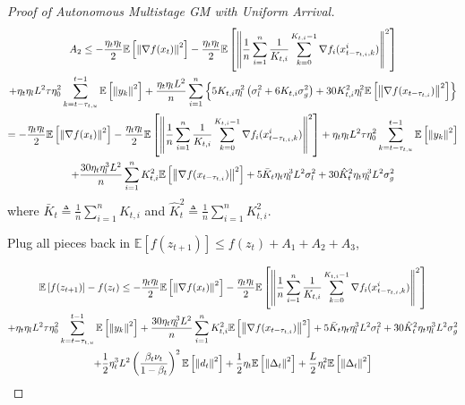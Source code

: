 \begin{proof}[Proof of Autonomous Multistage GM with Uniform Arrival]
\begin{equation}
\begin{gathered}
A_2 \leq - \frac{\eta_t\eta_l}{2} \mathbb{E}\left[\left\| \nabla f(x_t) \right\|^2\right] - \frac{\eta_t\eta_l}{2} \mathbb{E}\left[\left\| \frac{1}{n}\sum_{i=1}^n \frac{1}{K_{t,i}} \sum_{k=0}^{K_{t,i}-1} \nabla f_i(x_{t-\tau_{t,i},k}^i) \right\|^2\right] \\
+  \eta_t\eta_l L^2 \tau \eta_0^2 \sum_{k=t-\tau_{t,u}}^{t-1}\mathbb{E}\left[\left\|  y_k \right\|^2\right]  + \frac{\eta_t\eta_l L^2}{n}\sum_{i=1}^n \left\{ 5 K_{t,i}\eta_l^2\left(\sigma_l^2+6K_{t,i}\sigma_g^2\right)+30K_{t,i}^2\eta_l^2 \mathbb{E}\left[\left\| \nabla f(x_{t-\tau_{t,i}})\right\|^2\right]\right\}\\
=- \frac{\eta_t\eta_l}{2} \mathbb{E}\left[\left\| \nabla f(x_t) \right\|^2\right] - \frac{\eta_t\eta_l}{2} \mathbb{E}\left[\left\| \frac{1}{n}\sum_{i=1}^n \frac{1}{K_{t,i}} \sum_{k=0}^{K_{t,i}-1} \nabla f_i(x_{t-\tau_{t,i},k}^i) \right\|^2\right]+  \eta_t\eta_l L^2 \tau \eta_0^2 \sum_{k=t-\tau_{t,u}}^{t-1}\mathbb{E}\left[\left\|  y_k \right\|^2\right] \\
+ \frac{30 \eta_t\eta_l^3 L^2}{n}\sum_{i=1}^n K_{t,i}^2\mathbb{E}\left[\left\| \nabla f(x_{t-\tau_{t,i}})\right\|^2\right] + 5 \Bar{K}_t \eta_t\eta^3_l L^2\sigma_l^2 + 30 \hat{K}_t^2 \eta_t \eta^3_l L^2 \sigma_g^2
\end{gathered}\nonumber
\end{equation}
where $\bar{K}_t\triangleq \frac{1}{n}\sum_{i=1}^n K_{t,i}$ and $\hat{K}_t^2 \triangleq \frac{1}{n}\sum_{i=1}^n K^2_{t,i}$.


Plug all pieces back in $\mathbb{E}\left[f(z_{t+1})\right] \leq f(z_t) + A_1 + A_2 + A_3$,

\begin{equation}
\begin{gathered}
\mathbb{E}\left[f(z_{t+1})\right] - f(z_t) \leq 
- \frac{\eta_t\eta_l}{2} \mathbb{E}\left[\left\| \nabla f(x_t) \right\|^2\right] - \frac{\eta_t\eta_l}{2} \mathbb{E}\left[\left\| \frac{1}{n}\sum_{i=1}^n \frac{1}{K_{t,i}} \sum_{k=0}^{K_{t,i}-1} \nabla f_i(x_{t-\tau_{t,i},k}^i) \right\|^2\right]\\
+  \eta_t\eta_l L^2 \tau \eta_0^2 \sum_{k=t-\tau_{t,u}}^{t-1}\mathbb{E}\left[\left\|  y_k \right\|^2\right] 
+ \frac{30 \eta_t\eta_l^3 L^2}{n}\sum_{i=1}^n K_{t,i}^2\mathbb{E}\left[\left\| \nabla f(x_{t-\tau_{t,i}})\right\|^2\right] + 5 \Bar{K}_t \eta_t\eta^3_l L^2\sigma_l^2 + 30 \hat{K}_t^2 \eta_t \eta^3_l L^2 \sigma_g^2\\
+ \frac{1}{2}\eta_t^3 L^2\left(\frac{\beta_t\nu_t}{1-\beta_t}\right)^2\mathbb{E}\left[\left\| d_t\right\|^2\right] + \frac{1}{2}\eta_t\mathbb{E}\left[\left\|\Delta_t\right\|^2\right]  + \frac{L}{2}\eta_t^2\mathbb{E}\left[\left\| \Delta_t\right\|^2\right]
\end{gathered}\nonumber
\end{equation}



\end{proof}
